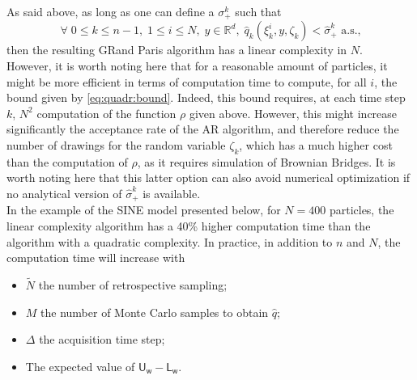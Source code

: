 \documentclass[12pt,draft]{article}
\newcommand{\eqsp}{\;}
\newcommand{\1}{\mathrm{1}}
\newcommand{\mw}{\mathsf{w}}%
\newcommand{\U}{\mathsf{U}}
\newcommand{\Lo}{\mathsf{L}}
\begin{document}
As said above, as long as one can define a $\sigma_+^k$ such that
$$ \forall\eqsp 0\leq k\leq n-1,\eqsp 1\leq i\leq N,\eqsp y\in\mathbb{R}^d,\eqsp \hat{q}_k(\xi_k^i,y,\zeta_k)<\hat{\sigma}_+^k \text{ a.s.,}$$ then the resulting GRand Paris algorithm has a linear complexity in $N$.\\
However, it is worth noting here that for a reasonable amount of particles, it might be more efficient in terms of computation time to compute, for all $i$, the bound given by \eqref{eq:quadr:bound}. Indeed, this bound requires, at each time step $k$, $N^2$ computation of the function $\rho$ given above. However, this might increase significantly the acceptance rate of the AR algorithm, and therefore reduce the number of drawings for the random variable $\zeta_k$, which has a much higher cost than the computation of $\rho$, as it requires simulation of Brownian Bridges. It is worth noting here that this latter option can also avoid numerical optimization if no analytical version of $\hat{\sigma}_+^k$ is available.\\
In the example of the SINE model presented below, for $N=400$ particles, the linear complexity algorithm has a 40\% higher computation time than the algorithm with a quadratic complexity. In practice, in addition to $n$ and $N$, the computation time will increase with
\begin{itemize}
\item $\tilde{N}$ the number of retrospective sampling;
\item $M$ the number of Monte Carlo samples to obtain $\hat{q}$;
\item $\Delta$ the acquisition time step;
\item The expected value of $\U_\mw-\Lo_\mw$.
\end{itemize}
\end{document}
